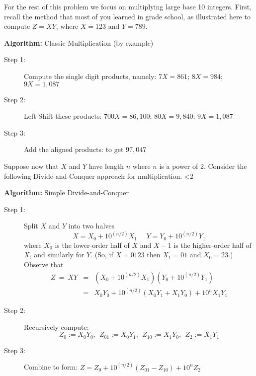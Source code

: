 \documentclass[11pt]{article}
\def\squarebox#1{\hbox to #1{\hfill\vbox to #1{\vfill}}}
\def\qed{\hspace*{\fill}
  \vbox{\hrule\hbox{\vrule\squarebox{.667em}\vrule}\hrule}}
\newenvironment{solution}{\begin{trivlist}\item[]{\bf Solution:}}
  {\qed \end{trivlist}}
\begin{document}
For the rest of this problem we focus on multiplying large base 10 integers.  First, recall the method that most of you learned in grade school, as illustrated here to compute $Z = XY$, where $X = 123$ and $Y= 789$.

\vspace*{.2in}
\noindent
{\bf Algorithm:} {\sc Classic Multiplication}
(by example)

\begin{description}
\item[Step 1:] Compute the single digit products, namely: 
$7X = 861$; $8X= 984$; $9X=1,087$
\item[Step 2:]
Left-Shift these products: 
$700X = 86,100$; $80X= 9,840$; $9X=1,087$

\item[Step 3:]
Add the aligned products: to get $97,047$
\end{description}



Suppose now that $X$ and $Y$ have length $n$ where $n$ is a power of 2.
Consider the following Divide-and-Conquer approach for multiplication.
\ifnum\me<2
\newpage
\fi



\vspace*{.2in}
\noindent
{\bf Algorithm:} {\sc Simple Divide-and-Conquer}


\begin{description}
\item[Step 1:]
Split $X$ and $Y$ into two halves
$$
X = X_0 + 10^{(n/2)}X_1  \ \ \ \ \ \ 
Y = Y_0 + 10^{(n/2)}Y_1
$$
where $X_0$ is the lower-order half of $X$ and $X-1$ is the higher-order half of $X$, and similarly for $Y$.  (So, if $X = 0123$ then 
$X_1 = 01$ and $X_0 = 23$.)
Observe that
$$
\begin{array}{lcl}
Z \ = \ XY & = & (X_0 + 10^{(n/2)}X_1)(Y_0 + 10^{(n/2)}Y_1) \\
& = & X_0Y_0 + 10^{(n/2)}(X_0Y_1 + X_1Y_0) + 10^nX_1Y_1
\end{array}
$$
\item[Step 2:] Recursively compute:
$$
Z_0 := X_0Y_0, \ \ 
Z_{01} := X_0Y_1, \ \ 
Z_{10} := X_1Y_0, \ \ 
Z_2 := X_1Y_1
$$
\item[Step 3:]
Combine to form: 
$Z = Z_0 + 10^{(n/2)}(Z_{01} - Z_{10}) + 10^nZ_2$
\end{description}
\end{document}
